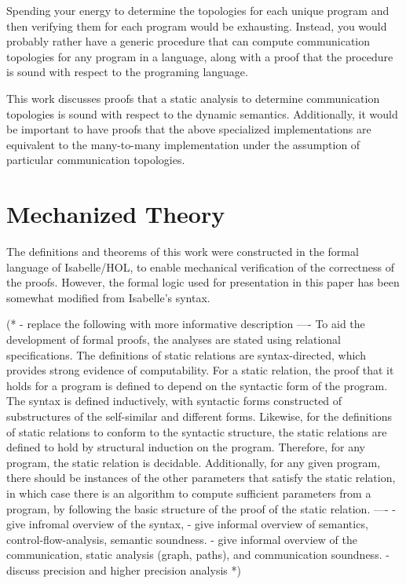 \documentclass[letterpaper, 11pt]{extarticle}
\begin{document}
Spending your energy to determine the topologies for each unique program and then verifying
them for each program would be exhausting. Instead, you would probably rather have a generic
procedure that can compute communication topologies for any program in a language, along with
a proof that the procedure is sound with respect to the programing language.

This work discusses proofs that a static analysis to determine communication topologies is
sound with respect to the dynamic semantics.
Additionally, it would be important to have proofs that the above specialized
implementations are equivalent to the many-to-many implementation under the assumption of
particular communication topologies.

\section{Mechanized Theory}

The definitions and theorems of this work were constructed in the formal
language of Isabelle/HOL,
to enable mechanical verification of the correctness of the proofs.
However, the formal logic used
for presentation in this paper has been somewhat modified from Isabelle's syntax. 

(*
- replace the following with more informative description
----
To aid the development of formal proofs, the analyses are stated using relational specifications.
The definitions of static relations are syntax-directed, which provides
strong evidence of computability.
For a static relation, the proof that it holds for a program is defined
to depend on the syntactic form of the program.
The syntax is defined inductively, with syntactic forms constructed of 
substructures of the self-similar and different forms.   
Likewise, for the definitions of static relations to conform to the
syntactic structure, the static relations are defined to hold
by structural induction on the program.
Therefore, for any program, the static relation is decidable.
Additionally, for any given program, there should be instances of the other
parameters that satisfy the static relation, in which case there is an
algorithm to compute sufficient parameters from a program,
by following the basic structure of the proof of the static relation.
----
- give infromal overview of the syntax,
- give informal overview of semantics, control-flow-analysis, semantic soundness.
- give informal overview of the communication, static analysis (graph, paths), and communication soundness. 
- discuss precision and higher precision analysis
*)
\end{document}
